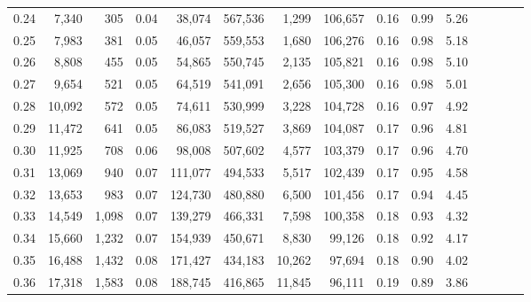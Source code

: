 \begin{tabular}{rrrcrrrrrrrrrrr}
0.24 &   7,340 &    305 &                                       0.04 &   38,074 &  567,536 &    1,299 &  106,657 &  0.16 &  0.99 &                         5.26 \\
0.25 &   7,983 &    381 &                                       0.05 &   46,057 &  559,553 &    1,680 &  106,276 &  0.16 &  0.98 &                         5.18 \\
0.26 &   8,808 &    455 &                                       0.05 &   54,865 &  550,745 &    2,135 &  105,821 &  0.16 &  0.98 &                         5.10 \\
0.27 &   9,654 &    521 &                                       0.05 &   64,519 &  541,091 &    2,656 &  105,300 &  0.16 &  0.98 &                         5.01 \\
0.28 &  10,092 &    572 &                                       0.05 &   74,611 &  530,999 &    3,228 &  104,728 &  0.16 &  0.97 &                         4.92 \\
0.29 &  11,472 &    641 &                                       0.05 &   86,083 &  519,527 &    3,869 &  104,087 &  0.17 &  0.96 &                         4.81 \\
0.30 &  11,925 &    708 &                                       0.06 &   98,008 &  507,602 &    4,577 &  103,379 &  0.17 &  0.96 &                         4.70 \\
0.31 &  13,069 &    940 &                                       0.07 &  111,077 &  494,533 &    5,517 &  102,439 &  0.17 &  0.95 &                         4.58 \\
0.32 &  13,653 &    983 &                                       0.07 &  124,730 &  480,880 &    6,500 &  101,456 &  0.17 &  0.94 &                         4.45 \\
0.33 &  14,549 &  1,098 &                                       0.07 &  139,279 &  466,331 &    7,598 &  100,358 &  0.18 &  0.93 &                         4.32 \\
0.34 &  15,660 &  1,232 &                                       0.07 &  154,939 &  450,671 &    8,830 &   99,126 &  0.18 &  0.92 &                         4.17 \\
0.35 &  16,488 &  1,432 &                                       0.08 &  171,427 &  434,183 &   10,262 &   97,694 &  0.18 &  0.90 &                         4.02 \\
0.36 &  17,318 &  1,583 &                                       0.08 &  188,745 &  416,865 &   11,845 &   96,111 &  0.19 &  0.89 &                         3.86 \\

\end{tabular}
